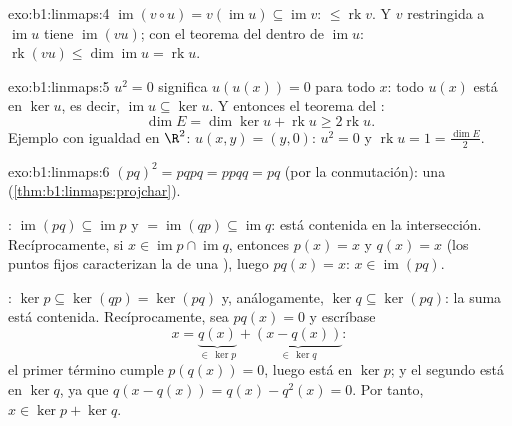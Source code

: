 \begin{solution}{exo:b1:linmaps:4}
$\operatorname{im}(v \circ u) = v(\operatorname{im} u) \subseteq
\operatorname{im} v$:  $\leq \operatorname{rk} v$. Y $v$
restringida a $\operatorname{im} u$ tiene 
$\operatorname{im}(vu)$; con el teorema del  dentro de
$\operatorname{im} u$: $\operatorname{rk}(vu) \leq
\dim\operatorname{im} u = \operatorname{rk} u$.
\end{solution}

\begin{solution}{exo:b1:linmaps:5}
$u^2 = 0$ significa $u(u(x)) = 0$ para todo $x$: todo $u(x)$ está en
$\ker u$, es decir, $\operatorname{im} u \subseteq \ker u$. Y
entonces el teorema del :
\[
\dim E = \dim\ker u + \operatorname{rk} u \geq 2\operatorname{rk} u .
\]
Ejemplo con igualdad en $\R^2$: $u(x, y) = (y, 0)$: $u^2 = 0$ y
$\operatorname{rk} u = 1 = \frac{\dim E}{2}$.
\end{solution}

\begin{solution}{exo:b1:linmaps:6}
$(pq)^2 = pqpq = ppqq = pq$ (por la conmutación): una 
(\cref{thm:b1:linmaps:projchar}).

: $\operatorname{im}(pq) \subseteq \operatorname{im} p$ y
$= \operatorname{im}(qp) \subseteq \operatorname{im} q$: está
contenida en la intersección. Recíprocamente, si
$x \in \operatorname{im} p \cap \operatorname{im} q$, entonces
$p(x) = x$ y $q(x) = x$ (los puntos fijos caracterizan la  de
una ), luego $pq(x) = x$: $x \in \operatorname{im}(pq)$.

: $\ker p \subseteq \ker(qp) = \ker(pq)$ y, análogamente,
$\ker q \subseteq \ker(pq)$: la suma está contenida.
Recíprocamente, sea $pq(x) = 0$ y escríbase
\[
x = \underbrace{q(x)}_{\in\, \ker p} +
\underbrace{(x - q(x))}_{\in\, \ker q} :
\]
el primer término cumple $p(q(x)) = 0$, luego está en $\ker p$; y el
segundo está en $\ker q$, ya que $q(x - q(x)) = q(x) - q^2(x) = 0$.
Por tanto, $x \in \ker p + \ker q$.
\end{solution}

